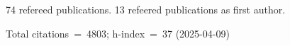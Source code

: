 74 refereed publications. 13 refeered publications as first author.

Total citations~=~4803; h-index~=~37 (2025-04-09)